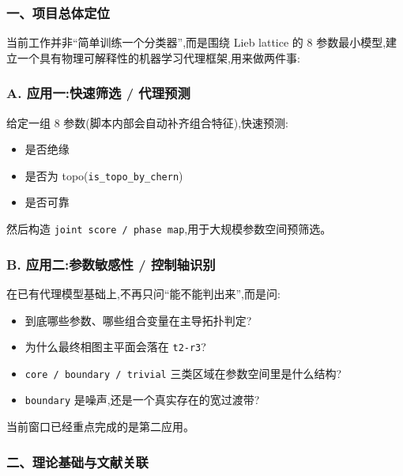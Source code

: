 \documentclass[lang=cn,scheme=chinese,color=blue,device=normal,toc=onecol,math=cm]{elegantbook}
\begin{document}
\subsubsection{一、项目总体定位}


当前工作并非“简单训练一个分类器”,而是围绕 Lieb lattice 的 8 参数最小模型,建立一个具有物理可解释性的机器学习代理框架,用来做两件事:\par


\subsubsection{A. 应用一:快速筛选 /\allowbreak{} 代理预测}


给定一组 8 参数(脚本内部会自动补齐组合特征),快速预测:\par


\begin{itemize}
\item 是否绝缘
\item 是否为 topo(\texttt{is\_\allowbreak{}topo\_\allowbreak{}by\_\allowbreak{}chern})
\item 是否可靠
\end{itemize}


然后构造 \texttt{joint score /\allowbreak{} phase map},用于大规模参数空间预筛选。\par


\subsubsection{B. 应用二:参数敏感性 /\allowbreak{} 控制轴识别}


在已有代理模型基础上,不再只问“能不能判出来”,而是问:\par


\begin{itemize}
\item 到底哪些参数、哪些组合变量在主导拓扑判定?
\item 为什么最终相图主平面会落在 \texttt{t2-r3}?
\item \texttt{core /\allowbreak{} boundary /\allowbreak{} trivial} 三类区域在参数空间里是什么结构?
\item \texttt{boundary} 是噪声,还是一个真实存在的宽过渡带?
\end{itemize}


当前窗口已经重点完成的是第二应用。\par


\subsubsection{二、理论基础与文献关联}
\end{document}
